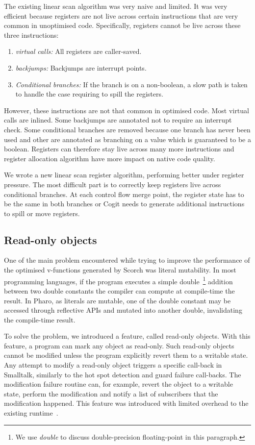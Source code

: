 \documentclass[a4paper,12pt,twoside]{../includes/ThesisStyle}
\begin{document}
The existing linear scan algorithm was very naive and limited. It was very efficient because registers are not live across certain instructions that are very common in unoptimised code. Specifically, registers cannot be live across these three instructions:
\begin{enumerate}
	\item \emph{virtual calls:} All registers are caller-saved.
	\item \emph{backjumps:} Backjumps are interrupt points.
	\item \emph{Conditional branches:} If the branch is on a non-boolean, a slow path is taken to handle the case requiring to spill the registers.
\end{enumerate}

However, these instructions are not that common in optimised code. Most virtual calls are inlined. Some backjumps are annotated not to require an interrupt check. Some conditional branches are removed because one branch has never been used and other are annotated as branching on a value which is guaranteed to be a boolean. Registers can therefore stay live across many more instructions and register allocation algorithm have more impact on native code quality.

We wrote a new linear scan register algorithm, performing better under register pressure. The most difficult part is to correctly keep registers live across conditional branches. At each control flow merge point, the register state has to be the same in both branches or Cogit needs to generate additional instructions to spill or move registers.

\subsection{Read-only objects}

One of the main problem encountered while trying to improve the performance of the optimised v-functions generated by Scorch was literal mutability. In most programming languages, if the program executes a simple double~\footnote{We use \emph{double} to discuss double-precision floating-point in this paragraph.} addition between two double constants the compiler can compute at compile-time the result. In Pharo, as literals are mutable, one of the double constant may be accessed through reflective APIs and mutated into another double, invalidating the compile-time result. 

To solve the problem, we introduced a feature, called read-only objects. With this feature, a program can mark any object as read-only. Such read-only objects cannot be modified unless the program explicitly revert them to a writable state. Any attempt to modify a read-only object triggers a specific call-back in Smalltalk, similarly to the hot spot detection and guard failure call-backs. The modification failure routine can, for example, revert the object to a writable state, perform the modification and notify a list of subscribers that the modification happened. This feature was introduced with limited overhead to the existing runtime~\cite{Bera16b}. 
\end{document}
